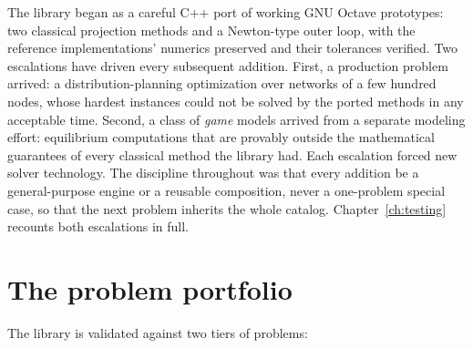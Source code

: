 The library began as a careful C++ port of working GNU Octave prototypes:
two classical projection methods and a Newton-type outer loop, with the
reference implementations' numerics preserved and their tolerances
verified. Two escalations have driven every subsequent addition. First, a
production problem arrived: a distribution-planning optimization over
networks of a few hundred nodes, whose hardest instances could not be
solved by the ported methods in any acceptable time. Second, a class of
\emph{game} models arrived from a separate modeling effort: equilibrium
computations that are provably outside the mathematical guarantees of
every classical method the library had. Each escalation forced new solver
technology. The discipline throughout was that every addition be a
general-purpose engine or a reusable composition, never a one-problem
special case, so that the next problem inherits the whole catalog.
Chapter~\ref{ch:testing} recounts both escalations in full.

\section{The problem portfolio}
\label{sec:o-portfolio}

The library is validated against two tiers of problems:

